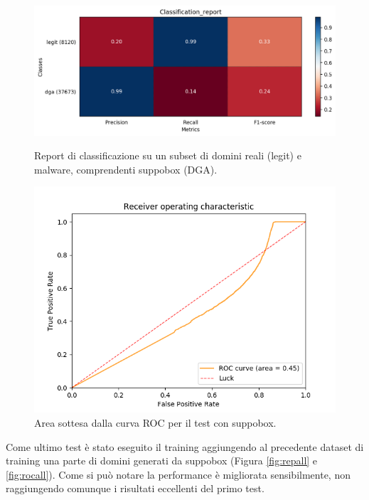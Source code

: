 \begin{figure}[!ht]
    \centering
    \includegraphics[width=\columnwidth]{figures/rndf_tra_nosup_sup/class_rep.png}
    \caption{Report di classificazione su un subset di domini reali (legit) e malware, comprendenti suppobox (DGA).\label{fig:repsup}}

    \centering
    \includegraphics[width=\columnwidth]{figures/rndf_tra_nosup_sup/roc_plot.png}
    \caption{Area sottesa dalla curva ROC per il test con  suppobox.\label{fig:rocsup}}
\end{figure}

Come ultimo test è stato eseguito il training aggiungendo al precedente dataset di training una parte di domini generati da suppobox (Figura \ref{fig:repall} e \ref{fig:rocall}). Come si può notare la performance è migliorata sensibilmente, non raggiungendo comunque i risultati eccellenti del primo test.

